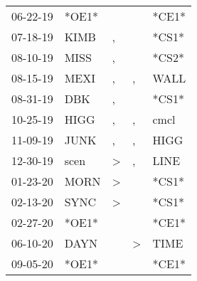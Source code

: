 \begin{supertabular}{p{0.07\textwidth}p{0.06\textwidth}p{0.02\textwidth}p{0.02\textwidth}p{0.06\textwidth}}
 06-22-19\textsuperscript{} &                            *OE1* &                  &               &                   *CE1* \\
 07-18-19\textsuperscript{} &           KIMB\textsuperscript{} &                , &               &                   *CS1* \\
 08-10-19\textsuperscript{} &           MISS\textsuperscript{} &                , &               &                   *CS2* \\
 08-15-19\textsuperscript{} &           MEXI\textsuperscript{} &                , &             , &  WALL\textsuperscript{} \\
 08-31-19\textsuperscript{} &            DBK\textsuperscript{} &                , &               &                   *CS1* \\
 10-25-19\textsuperscript{} &           HIGG\textsuperscript{} &                , &             , &  cmcl\textsuperscript{} \\
 11-09-19\textsuperscript{} &           JUNK\textsuperscript{} &                , &             , &  HIGG\textsuperscript{} \\
 12-30-19\textsuperscript{} &           scen\textsuperscript{} &     \textgreater &             , &  LINE\textsuperscript{} \\
 01-23-20\textsuperscript{} &           MORN\textsuperscript{} &     \textgreater &               &                   *CS1* \\
 02-13-20\textsuperscript{} &           SYNC\textsuperscript{} &     \textgreater &               &                   *CS1* \\
 02-27-20\textsuperscript{} &                            *OE1* &                  &               &                   *CE1* \\
 06-10-20\textsuperscript{} &           DAYN\textsuperscript{} &                  &  \textgreater &  TIME\textsuperscript{} \\
 09-05-20\textsuperscript{} &                            *OE1* &                  &               &                   *CE1* \\
\end{supertabular}
